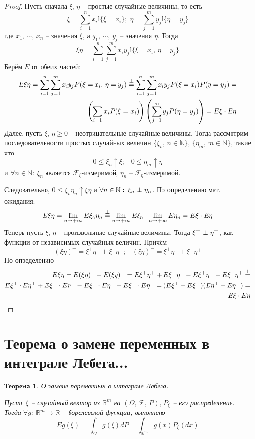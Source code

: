 \documentclass[a4paper,12pt]{article}
\renewcommand{\leq}{\ensuremath{\leqslant}}
\renewcommand{\geq}{\ensuremath{\geqslant}}
\newcommand\independent{\protect\mathpalette{\protect\independenT}{\perp}}
\def\independenT#1#2{\mathrel{\rlap{$#1#2$}\mkern2mu{#1#2}}}
\theoremstyle{plain}
\newtheorem{theorem}{Теорема}[section]
\theoremstyle{definition}
\theoremstyle{remark}
\begin{document}
\begin{proof}
	Пусть сначала $\xi,\, \eta$ -- простые случайные величины, то есть
	\[\xi = \sum_{i = 1}^n x_i\mathbb{I}\{\xi = x_i\};\; \eta = \sum_{j = 1}^m y_j\mathbb{I}\{\eta = y_j\}\]
	где $x_1,\,\cdots,\,x_n$ -- значения $\xi$, а $y_1,\,\cdots,\,y_j$ -- значения $\eta$. Тогда
	\[\xi\eta = \sum_{i = 1}^n\sum_{j = 1}^m x_iy_j \mathbb{I}\{\xi = x_i,\, \eta = y_j\}\]
	Берём $E$ от обеих частей:
	\begin{align*}
		E\xi\eta = \sum_{i = 1}^n\sum_{j = 1}^m x_iy_j P(\xi = x_i,\, \eta = y_j) \stackrel{\independent}{=} \sum_{i = 1}^n\sum_{j = 1}^m x_iy_j P(\xi = x_i)P(\eta = y_j) = \\
		\left(\sum_{i = 1}x_iP(\xi = x_i)\right)\left(\sum_{j = 1}^my_jP(\eta = y_j)\right) = E\xi\cdot E\eta
	\end{align*}
	Далее, пусть $\xi,\,\eta \geq 0$ -- неотрицательные случайные величины. Тогда рассмотрим последовательности простых случайных величин $\{\xi_n,\, n \in \mathbb{N}\},\, \{\eta_m,\, m \in \mathbb{N}\}$, такие что
	\[0 \leq \xi_n \uparrow \xi ;\;\;\; 0 \leq \eta_m \uparrow \eta\]
	и $\forall n \in \mathbb{N}:\: \xi_n$ является $\mathcal{F}_\xi$-измеримой, $\eta_n$ -- $\mathcal{F}_\eta$-измеримой.

	Следовательно, $0 \leq \xi_n\eta_n \uparrow \xi\eta$ и $\forall n \in \mathbb{N}:\: \xi_n \independent \eta_n$. По определению мат. ожидания:
	\[E\xi\eta = \lim_{n \to +\infty} E\xi_n\eta_n \stackrel{\independent}{=} \lim_{n \to +\infty}E\xi_n\cdot \lim_{n \to +\infty}E\eta_n = E\xi\cdot E\eta\]
	Теперь пусть $\xi,\, \eta$ -- произвольные случайные величины. Тогда $\xi^\pm \independent \eta^\pm$, как функции от независимых случайных величин. Причём
	\[(\xi\eta)^+ = \xi^+\eta^+ + \xi^-\eta^- ;\;\;\; (\xi\eta)^- = \xi^+\eta^- + \xi^-\eta^+\]
	По определению
	\begin{align*}
		E\xi\eta = E(\xi\eta)^+ - E(\xi\eta)^- = E\xi^+\eta^+ + E\xi^-\eta^- - E\xi^+\eta^- - E\xi^-\eta^+ \stackrel{\independent}{=}   \\
		E\xi^+\cdot E\eta^+ + E\xi^-\cdot E\eta^- - E\xi^+ \cdot E\eta^- - E\xi^-\cdot E\eta^+ = (E\xi^+ - E\xi^-)(E\eta^+ - E\eta^-) = \\
		E\xi \cdot E\eta
	\end{align*}
\end{proof}

\section{Теорема о замене переменных в интеграле Лебега...}
\begin{theorem}
	О замене переменных в интеграле Лебега.

	Пусть $\xi$ -- случайный вектор из $\mathbb{R}^m$ на $(\Omega,\, \mathcal{F},\,P),\, P_\xi$ -- его распределение. Тогда $\forall g:\: \mathbb{R}^m \to \mathbb{R}$ -- борелевской функции, выполнено
	\[Eg(\xi) = \int_\Omega g(\xi)dP = \int_{\mathbb{R}^m}g(x)P_\xi(dx)\]
\end{theorem}
\end{document}
